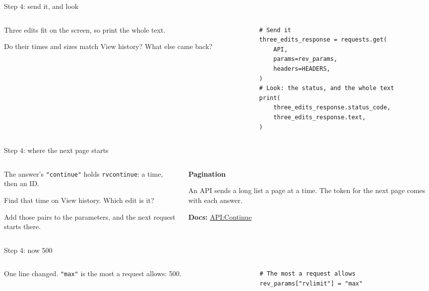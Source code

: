 \documentclass[9pt,aspectratio=169]{beamer}
\begin{document}
\begin{frame}[fragile]{Step 4: send it, and look}
    \begin{columns}[T]
        \begin{column}{0.37\textwidth}
            Three edits fit on the screen, so print the whole text.

            \medskip
            Do their times and sizes match View history? What else came back?
        \end{column}
        \begin{column}{0.6\textwidth}
\begin{lstlisting}
# Send it
three_edits_response = requests.get(
    API,
    params=rev_params,
    headers=HEADERS,
)
# Look: the status, and the whole text
print(
    three_edits_response.status_code,
    three_edits_response.text,
)
\end{lstlisting}
        \end{column}
    \end{columns}
\end{frame}

\begin{frame}{Step 4: where the next page starts}
    \begin{columns}[T]
        \begin{column}{0.6\textwidth}
            The answer's \texttt{"continue"} holds \texttt{rvcontinue}: a time, then an ID.

            \medskip
            Find that time on View history. Which edit is it?

            \medskip
            Add those pairs to the parameters, and the next request starts there.
        \end{column}
        \begin{column}{0.35\textwidth}
            \textbf{Pagination}\\[2pt]
            {\footnotesize An API sends a long list a page at a time. The token for the next page comes with each answer.\par\medskip \textbf{Docs:} \href{https://www.mediawiki.org/wiki/API:Continue}{API:Continue}\par}
        \end{column}
    \end{columns}
\end{frame}

\begin{frame}[fragile]{Step 4: now 500}
    \begin{columns}[T]
        \begin{column}{0.37\textwidth}
            One line changed. \texttt{"max"} is the most a request allows: 500.
        \end{column}
        \begin{column}{0.6\textwidth}
\begin{lstlisting}
# The most a request allows
rev_params["rvlimit"] = "max"
\end{lstlisting}
        \end{column}
    \end{columns}
\end{frame}
\end{document}
